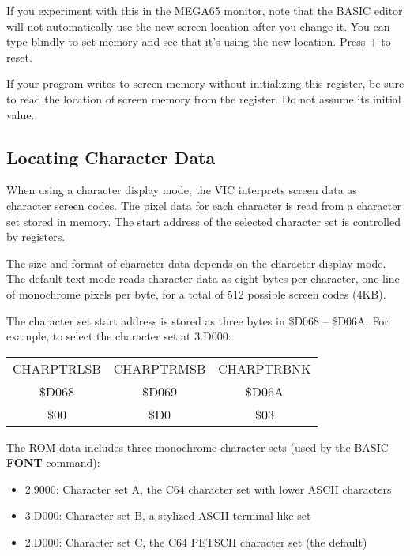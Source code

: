 If you experiment with this in the MEGA65 monitor, note that the BASIC editor
will not automatically use the new screen location after you change it. You can
type blindly to set memory and see that it's using the new location. Press
 +  to reset.

If your program writes to screen memory without initializing this register,
be sure to read the location of screen memory from the register. Do not assume
its initial value.

\subsection{Locating Character Data}

When using a character display mode, the VIC interprets screen data as
character screen codes. The pixel data for each character is read from a
character set stored in memory. The start address of the selected character set
is controlled by registers.

The size and format of character data depends
on the character display mode. The default text mode reads character data as
eight bytes per character, one line of monochrome pixels per byte, for a total
of 512 possible screen codes (4KB).

The character set start address is stored as three bytes in \$D068 -- \$D06A.
For example, to select the character set at 3.D000:

\begin{center}
\begin{tabular}{|c|c|c|}
\hline
CHARPTRLSB & CHARPTRMSB & CHARPTRBNK \\
\$D068 & \$D069 & \$D06A \\
\hline
\$00 & \$D0 & \$03 \\
\hline
\end{tabular}
\end{center}

The ROM data includes three monochrome character sets (used by the BASIC {\bf
FONT} command):

\begin{itemize}
\item 2.9000: Character set A, the C64 character set with lower ASCII characters
\item 3.D000: Character set B, a stylized ASCII terminal-like set
\item 2.D000: Character set C, the C64 PETSCII character set (the default)
\end{itemize}

